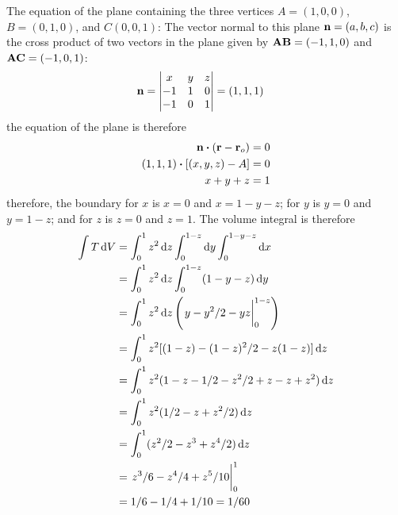 \documentclass[../main.tex]{subfiles}
\begin{document}
The equation of the plane containing the three vertices $A=(1,0,0)$, $B=(0,1,0)$, and $C(0,0,1)$:
The vector normal to this plane $\vb{n} = (a, b, c)$ is the cross product of two vectors in the
plane given by $\vb{AB} = (-1, 1, 0)$ and $\vb{AC} = (-1, 0, 1)$:
\begin{align*}
    \vb{n} = \begin{vmatrix}
        x & y & z \\
        -1 & 1 & 0 \\
        -1 & 0 & 1
    \end{vmatrix} &= (1, 1, 1)
\end{align*}
the equation of the plane is therefore
\begin{align*}
    \vb{n} \vdot (\vb{r} - \vb{r}_o) &= 0 \\
    (1, 1, 1) \vdot [(x, y, z) - A] &= 0 \\
    x + y + z &= 1
\end{align*}
therefore, the boundary for $x$ is $x = 0$ and $x = 1 - y - z$; for $y$ is $y = 0$ and $y = 1 - z$;
and for $z$ is $z = 0$ and $z = 1$. The volume integral is therefore
\begin{align*}
    \int T\dd{V} &= \int_0^1 z^2 \dd{z} \int_0^{1-z} \dd{y} \int_0^{1-y-z} \dd{x} \\
    &= \int_0^1 z^2 \dd{z} \int_0^{1-z} (1-y-z) \dd{y} \\
    &= \int_0^1 z^2 \dd{z} \qt(\eval{y - y^2/2 -yz}_0^{1-z}) \\
    &= \int_0^1 z^2 [(1-z) - (1-z)^2/2 - z(1-z)] \dd{z} \\
    &= \int_0^1 z^2 (1-z-1/2-z^2/2+z-z+z^2) \dd{z} \\
    &= \int_0^1 z^2 (1/2 - z + z^2/2) \dd{z} \\
    &= \int_0^1 (z^2/2 - z^3 + z^4/2) \dd{z} \\
    &= \eval{z^3/6 - z^4/4 + z^5/10}_0^1 \\
    &= 1/6 - 1/4 + 1/10 = 1/60
\end{align*}
\end{document}
